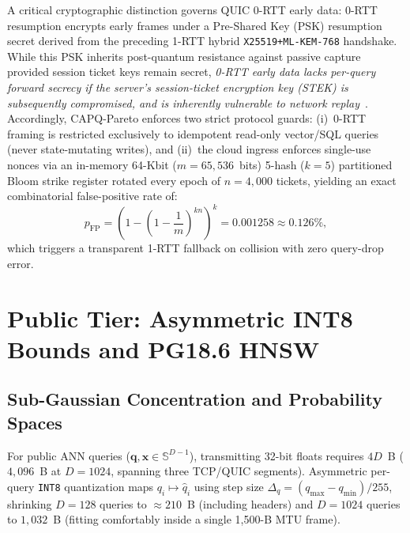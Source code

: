 \documentclass[10pt,journal,compsoc]{IEEEtran}
\begin{document}
A critical cryptographic distinction governs QUIC 0-RTT early data: 0-RTT resumption encrypts early frames under a Pre-Shared Key (PSK) resumption secret derived from the preceding 1-RTT hybrid \nolinkurl{X25519+ML-KEM-768} handshake. While this PSK inherits post-quantum resistance against passive capture provided session ticket keys remain secret, \emph{0-RTT early data lacks per-query forward secrecy if the server's session-ticket encryption key (STEK) is subsequently compromised, and is inherently vulnerable to network replay}~\cite{rfc9000}. Accordingly, CAPQ-Pareto enforces two strict protocol guards: (i)~0-RTT framing is restricted exclusively to idempotent read-only vector/SQL queries (never state-mutating writes), and (ii)~the cloud ingress enforces single-use nonces via an in-memory 64-Kbit ($m = 65,536$~bits) 5-hash ($k=5$) partitioned Bloom strike register rotated every epoch of $n = 4,000$ tickets, yielding an exact combinatorial false-positive rate of:
\begin{equation}
p_{\text{FP}} = \left(1 - \left(1 - \frac{1}{m}\right)^{kn}\right)^k = 0.001258 \approx 0.126\%,
\end{equation}
which triggers a transparent 1-RTT fallback on collision with zero query-drop error.

\section{Public Tier: Asymmetric INT8 Bounds and PG18.6 HNSW}
\subsection{Sub-Gaussian Concentration and Probability Spaces}
For public ANN queries ($\mathbf{q}, \mathbf{x} \in \mathbb{S}^{D-1}$), transmitting 32-bit floats requires $4D$~B ($4,096$~B at $D=1024$, spanning three TCP/QUIC segments). Asymmetric per-query \texttt{INT8} quantization maps $q_i \mapsto \hat{q}_i$ using step size $\Delta_q = (q_{\max} - q_{\min})/255$, shrinking $D=128$ queries to $\approx 210$~B (including headers) and $D=1024$ queries to $1,032$~B (fitting comfortably inside a single 1,500-B MTU frame).
\end{document}
